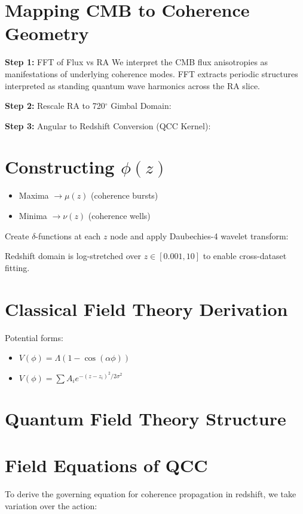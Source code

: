 \documentclass[12pt]{article}
\begin{document}
	\section{Mapping CMB to Coherence Geometry}
	\textbf{Step 1:} FFT of Flux vs RA\newline
	We interpret the CMB flux anisotropies as manifestations of underlying coherence modes. FFT extracts periodic structures interpreted as standing quantum wave harmonics across the RA slice.
	
	\textbf{Step 2:} Rescale RA to 720$^\circ$ Gimbal Domain:
	
	
	\textbf{Step 3:} Angular to Redshift Conversion (QCC Kernel):
	
	
	\section{Constructing $\phi(z)$}
	\begin{itemize}
		\item Maxima $\rightarrow \mu(z)$ (coherence bursts)
		\item Minima $\rightarrow \nu(z)$ (coherence wells)
	\end{itemize}
	Create $\delta$-functions at each $z$ node and apply Daubechies-4 wavelet transform:
	
	Redshift domain is log-stretched over $z \in [0.001, 10]$ to enable cross-dataset fitting.
	
	\section{Classical Field Theory Derivation}
	
	
	Potential forms:
	\begin{itemize}
		\item $V(\phi) = \Lambda (1 - \cos(\alpha \phi))$
		\item $V(\phi) = \sum A_i e^{-(z - z_i)^2 / 2\sigma^2}$
	\end{itemize}
	
	\section{Quantum Field Theory Structure}
	
	
	
	\section{Field Equations of QCC}
	To derive the governing equation for coherence propagation in redshift, we take variation over the action:
	
\end{document}

